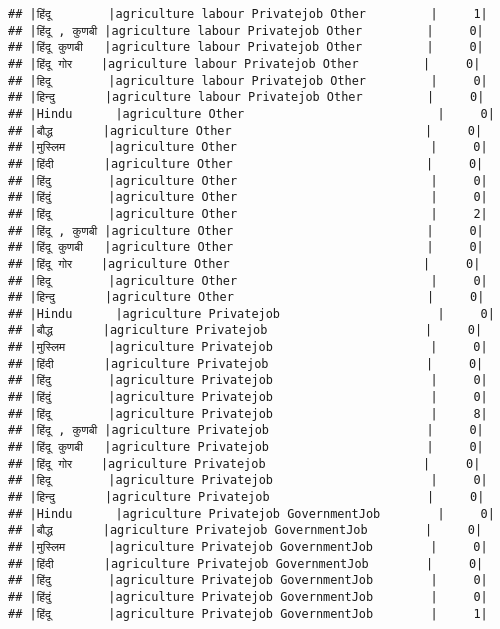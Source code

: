 \documentclass[
]{article}
\begin{document}
\begin{verbatim}
## |हिंदू        |agriculture labour Privatejob Other         |     1|
## |हिंदू , कुणबी |agriculture labour Privatejob Other         |     0|
## |हिंदू कुणबी   |agriculture labour Privatejob Other         |     0|
## |हिंदू गोर    |agriculture labour Privatejob Other         |     0|
## |हिदू        |agriculture labour Privatejob Other         |     0|
## |हिन्दु       |agriculture labour Privatejob Other         |     0|
## |Hindu      |agriculture Other                           |     0|
## |बौद्ध       |agriculture Other                           |     0|
## |मुस्लिम      |agriculture Other                           |     0|
## |हिंदी       |agriculture Other                           |     0|
## |हिंदु        |agriculture Other                           |     0|
## |हिंदुं        |agriculture Other                           |     0|
## |हिंदू        |agriculture Other                           |     2|
## |हिंदू , कुणबी |agriculture Other                           |     0|
## |हिंदू कुणबी   |agriculture Other                           |     0|
## |हिंदू गोर    |agriculture Other                           |     0|
## |हिदू        |agriculture Other                           |     0|
## |हिन्दु       |agriculture Other                           |     0|
## |Hindu      |agriculture Privatejob                      |     0|
## |बौद्ध       |agriculture Privatejob                      |     0|
## |मुस्लिम      |agriculture Privatejob                      |     0|
## |हिंदी       |agriculture Privatejob                      |     0|
## |हिंदु        |agriculture Privatejob                      |     0|
## |हिंदुं        |agriculture Privatejob                      |     0|
## |हिंदू        |agriculture Privatejob                      |     8|
## |हिंदू , कुणबी |agriculture Privatejob                      |     0|
## |हिंदू कुणबी   |agriculture Privatejob                      |     0|
## |हिंदू गोर    |agriculture Privatejob                      |     0|
## |हिदू        |agriculture Privatejob                      |     0|
## |हिन्दु       |agriculture Privatejob                      |     0|
## |Hindu      |agriculture Privatejob GovernmentJob        |     0|
## |बौद्ध       |agriculture Privatejob GovernmentJob        |     0|
## |मुस्लिम      |agriculture Privatejob GovernmentJob        |     0|
## |हिंदी       |agriculture Privatejob GovernmentJob        |     0|
## |हिंदु        |agriculture Privatejob GovernmentJob        |     0|
## |हिंदुं        |agriculture Privatejob GovernmentJob        |     0|
## |हिंदू        |agriculture Privatejob GovernmentJob        |     1|

\end{verbatim}
\end{document}
